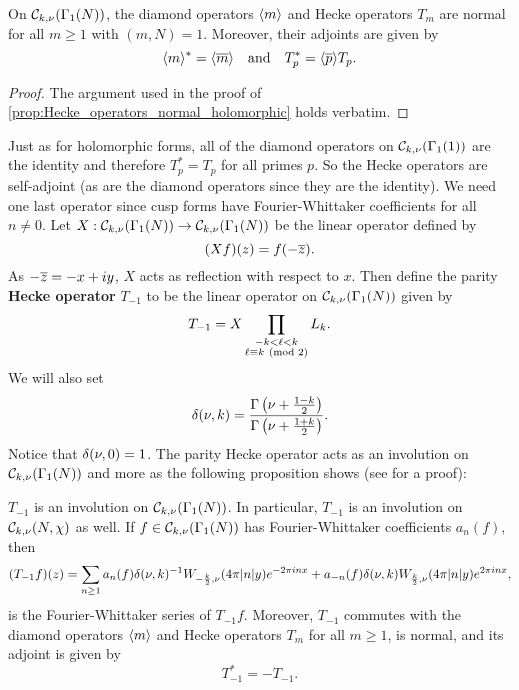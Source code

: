     \begin{proposition}\label{prop:Hecke_operators_normal_Maass}
      On $\mathcal{C}_{k,\nu}(\Gamma_{1}(N))$, the diamond operators $\langle m\rangle$ and Hecke operators $T_{m}$ are normal for all $m \ge 1$ with $(m,N) = 1$. Moreover, their adjoints are given by
      \[
        \langle m\rangle^{\ast} = \langle\overline{m}\rangle \quad \text{and} \quad T_{p}^{\ast} = \langle\overline{p}\rangle T_{p}.
      \]
    \end{proposition}
    \begin{proof}
      The argument used in the proof of \cref{prop:Hecke_operators_normal_holomorphic} holds verbatim.
    \end{proof}

    Just as for holomorphic forms, all of the diamond operators on $\mathcal{C}_{k,\nu}(\Gamma_{1}(1))$ are the identity and therefore $T_{p}^{\ast} = T_{p}$ for all primes $p$. So the Hecke operators are self-adjoint (as are the diamond operators since they are the identity). We need one last operator since cusp forms have Fourier-Whittaker coefficients for all $n \neq 0$. Let $X:\mathcal{C}_{k,\nu}(\Gamma_{1}(N)) \to \mathcal{C}_{k,\nu}(\Gamma_{1}(N))$ be the linear operator defined by
    \[
      (Xf)(z) = f(-\overline{z}).
    \]
    As $-\overline{z} = -x+iy$, $X$ acts as reflection with respect to $x$. Then define the parity \textbf{Hecke operator} $T_{-1}$ to be the linear operator on $\mathcal{C}_{k,\nu}(\Gamma_{1}(N))$ given by
    \[
      T_{-1} = X\prod_{\substack{-k < \ell < k \\ \ell \equiv k \ \left(\text{mod }2\right)}}L_{k}.
    \]
    We will also set
    \[
      \delta(\nu,k) = \frac{\Gamma\left(\nu+\frac{1-k}{2}\right)}{\Gamma\left(\nu+\frac{1+k}{2}\right)}.
    \]
    Notice that $\delta(\nu,0) = 1$. The parity Hecke operator acts as an involution on $\mathcal{C}_{k,\nu}(\Gamma_{1}(N))$ and more as the following proposition shows (see \cite{duke2002subconvexity} for a proof):

    \begin{proposition}\label{prop:parity_operator_properties}
      $T_{-1}$ is an involution on $\mathcal{C}_{k,\nu}(\Gamma_{1}(N))$. In particular, $T_{-1}$ is an involution on $\mathcal{C}_{k,\nu}(N,\chi)$ as well. If $f \in \mathcal{C}_{k,\nu}(\Gamma_{1}(N))$ has Fourier-Whittaker coefficients $a_{n}(f)$, then
      \[
        (T_{-1}f)(z) = \sum_{n \ge 1}a_{n}(f)\delta(\nu,k)^{-1}W_{-\frac{k}{2},\nu}(4\pi |n|y)e^{-2\pi inx}+a_{-n}(f)\delta(\nu,k)W_{\frac{k}{2},\nu}(4\pi |n|y)e^{2\pi inx},
      \]
      is the Fourier-Whittaker series of $T_{-1}f$. Moreover, $T_{-1}$ commutes with the diamond operators $\langle m\rangle$ and Hecke operators $T_{m}$ for all $m \ge 1$, is normal, and its adjoint is given by
      \[
        T_{-1}^{\ast} = -T_{-1}.
      \]
    \end{proposition}

